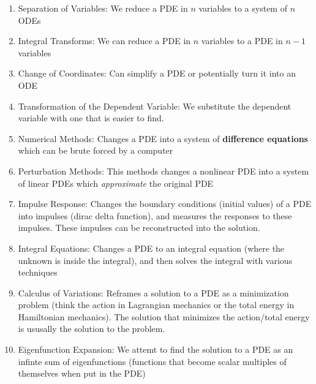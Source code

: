 \documentclass{article}
\begin{document}
\begin{enumerate}
    \item Separation of Variables: We reduce a PDE in $n$ variables to a system of $n$ ODEs
    \item Integral Transforms: We can reduce a PDE in $n$ variables to a PDE in $n-1$ variables
    \item Change of Coordinates: Can simplify a PDE or potentially turn it into an ODE
    \item Transformation of the Dependent Variable: We substitute the dependent variable with one that is easier to find.
    \item Numerical Methods: Changes a PDE into a system of \textbf{difference equations} which can be brute forced by a computer
    \item Perturbation Methods: This methods changes a nonlinear PDE into a system of linear PDEs which \textit{approximate} the original PDE
    \item Impulse Response: Changes the boundary conditions (initial values) of a PDE into impulses (dirac delta function), and measures the responses to these impulses. These impulses can be reconstructed into the solution.
    \item Integral Equations: Changes a PDE to an integral equation (where the unknown is inside the integral), and then solves the integral with various techniques
    \item Calculus of Variations: Reframes a solution to a PDE as a minimization problem (think the action in Lagrangian mechanics or the total energy in Hamiltonian mechanics). The solution that minimizes the action/total energy is ususally the solution to the problem.
    \item Eigenfunction Expansion: We attemt to find the solution to a PDE as an infinte sum of eigenfunctions (functions that become scalar multiples of themselves when put in the PDE)
\end{enumerate}
\end{document}
